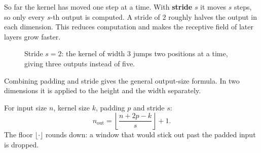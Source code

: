 \documentclass[12pt, a4paper]{article}
\newcommand{\drawgrid}[3]{%
  \begin{scope}[shift={#1}]
    \foreach \row [count=\r] in {#3} {
        \foreach \v [count=\c] in \row {
            \draw[gray!70, fill=#2] (\c-1,-\r+1) rectangle ++(1,-1);
            \node[font=\small] at (\c-0.5,-\r+0.5) {$\v$};
          }
      }
  \end{scope}%
}
\begin{document}
So far the kernel has moved one step at a time. With \textbf{stride} $s$ it
moves $s$ steps, so only every $s$-th output is computed. A stride of $2$
roughly halves the output in each dimension. This reduces computation and
makes the receptive field of later layers grow faster.

\begin{figure}[H]
  \centering
  \caption{Stride $s = 2$: the kernel of width $3$ jumps two positions at a
    time, giving three outputs instead of five.}
  \label{fig:stride}
\end{figure}

Combining padding and stride gives the general output-size formula. In two
dimensions it is applied to the height and the width separately.

\begin{resultbox}
  For input size $n$, kernel size $k$, padding $p$ and stride $s$:
  \[
    n_{\text{out}} = \left\lfloor \frac{n + 2p - k}{s} \right\rfloor + 1 .
  \]
  The floor $\lfloor\cdot\rfloor$ rounds down: a window that would stick out
  past the padded input is dropped.
\end{resultbox}
\end{document}
